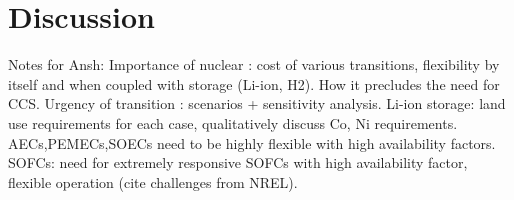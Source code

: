 \section{Discussion}
Notes for Ansh:
Importance of nuclear : cost of various transitions, flexibility by itself and when coupled with storage (Li-ion, H2). How it precludes the need for CCS.
Urgency of transition : scenarios + sensitivity analysis.
Li-ion storage: land use requirements for each case, qualitatively discuss Co, Ni requirements.
AECs,PEMECs,SOECs need to be highly flexible with high availability factors.
SOFCs: need for extremely responsive SOFCs with high availability factor, flexible operation (cite challenges from NREL).